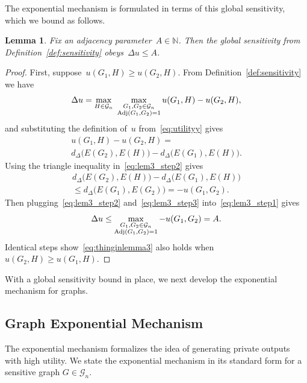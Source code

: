\documentclass[conference]{ieeeconf}
\newtheorem{lemma}{Lemma}
\newcommand{\G}{\mathcal{G}}
\newcommand{\uti}{d_\Delta}
\begin{document}
The exponential mechanism is formulated in terms of this global sensitivity, which we bound
as follows. 

\begin{lemma} \label{lem:sensitivity}
    Fix an adjacency parameter~$A\in \mathbb{N}$. Then the global sensitivity from Definition~\ref{def:sensitivity} obeys~$\Delta u \leq A$. 
\end{lemma}

\begin{proof}
    First, suppose~$u(G_1,H)\geq u(G_2,H)$. 
    From Definition~\ref{def:sensitivity} we have 
    \begin{equation} \label{eq:lem3_step1}
        \Delta u = \max_{H \in \G_n} \  \max_{\substack{G_1, G_2 \in \G_n \\ \textnormal{Adj}(G_1, G_2) = 1}} u(G_1,H)-u(G_2,H), 
    \end{equation}
    and substituting the definition of~$u$ from~\eqref{eq:utilityy} gives
    \begin{multline}
        u(G_1, H)-u(G_2,H) = \\
        \uti\big(E(G_2),E(H)\big) - \uti\big(E(G_1),E(H)\big).
        \label{eq:lem3_step2}
    \end{multline}
    Using the triangle inequality in~\eqref{eq:lem3_step2} gives
    \begin{multline}
        \uti\big(E(G_2),E(H)\big) - \uti\big(E(G_1),E(H)\big) \\ \leq d_\Delta\big(E(G_1),E(G_2)\big) = -u(G_1,G_2).
        \label{eq:lem3_step3}
    \end{multline}
    Then plugging~\eqref{eq:lem3_step2} and~\eqref{eq:lem3_step3} into~\eqref{eq:lem3_step1} gives
    \begin{equation} \label{eq:thinginlemma3}
        \Delta u \leq \max_{\substack{G_1, G_2 \in \G_n \\ \textnormal{Adj}(G_1, G_2) = 1}} -u(G_1,G_2) = A.
    \end{equation}
    Identical steps show~\eqref{eq:thinginlemma3} also holds when $u(G_2,H) \geq u(G_1,H)$.
\end{proof}

With a global sensitivity bound in place, we next develop the exponential mechanism for graphs.

\subsection{Graph Exponential Mechanism}
\label{sec:exp_mech}
The exponential mechanism formalizes the idea of generating private outputs with high utility.
We state the exponential mechanism in its standard form 
for a sensitive graph $G \in \G_n$.
\end{document}
